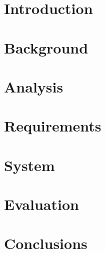 


\noindent



\tableofcontents

\chapter{Introduction} \label{introduction}

\chapter{Background} \label{background}

\chapter{Analysis} \label{analysis}

\chapter{Requirements} \label{requirements}

\chapter{System} \label{system}

\chapter{Evaluation} \label{evaluation}

\chapter{Conclusions} \label{conclusions}


\printacronyms




